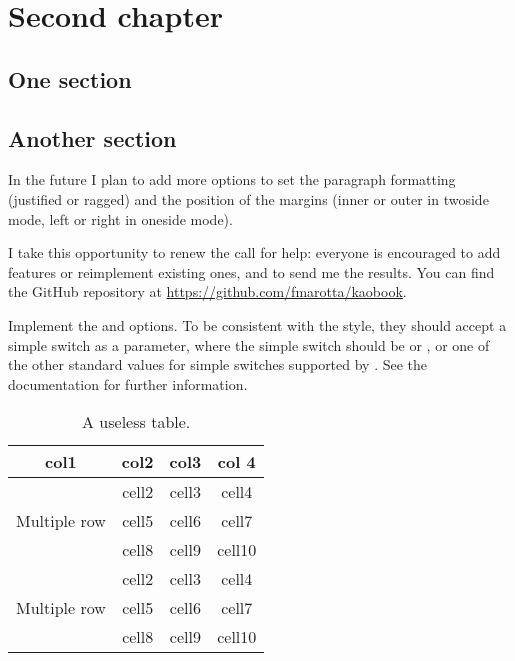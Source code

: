\setchapterpreamble[u]{\margintoc}
\chapter{Second chapter}

\section{One section}
\blindtext

\section{Another section}
\blindtext

In the future I plan to add more options to set the paragraph formatting
(justified or ragged) and the position of the margins (inner or outer in
twoside mode, left or right in oneside mode).

I take this opportunity to renew the call for help: everyone is
encouraged to add features or reimplement existing ones, and to send me
the results. You can find the GitHub repository at
\url{https://github.com/fmarotta/kaobook}.

\begin{kaobox}[title=To Do]
  Implement the  and  options. To be
  consistent with the \KOMAScript\xspace style, they should accept a
  simple switch as a parameter, where the simple switch should be
   or , or one of the other standard values for
  simple switches supported by \KOMAScript. See the \KOMAScript\xspace
  documentation for further information.
\end{kaobox}

\blindtext

\begin{table}[ht]
\caption[A useless table]{A useless table.}
\begin{tabular}{ c c c c }
	\toprule
	col1 & col2 & col3 & col 4 \\
	\midrule
	\multirow{3}{4em}{Multiple row} & cell2 & cell3 & cell4\\ &
	cell5 & cell6 & cell7 \\ &
	cell8 & cell9 & cell10 \\
	\multirow{3}{4em}{Multiple row} & cell2 & cell3 & cell4 \\ &
	cell5 & cell6 & cell7 \\ &
	cell8 & cell9 & cell10 \\
	\bottomrule
\end{tabular}
\end{table}


